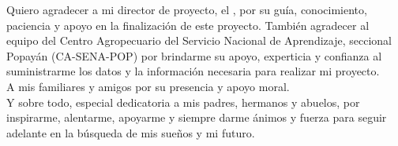 
Quiero agradecer a mi director de proyecto, el \director, por su guía, conocimiento, paciencia  y apoyo en la finalización de este proyecto. También agradecer al  equipo del Centro Agropecuario del Servicio Nacional de Aprendizaje, seccional Popayán (CA-SENA-POP) por brindarme su apoyo, experticia y confianza al suministrarme los datos y la información necesaria para realizar mi proyecto.\\

A mis familiares y amigos por su presencia y apoyo moral.\\

Y sobre todo, especial dedicatoria a mis padres, hermanos y abuelos, por inspirarme, alentarme, apoyarme y siempre darme ánimos y fuerza para seguir adelante en la búsqueda de mis sueños y mi futuro.\\

